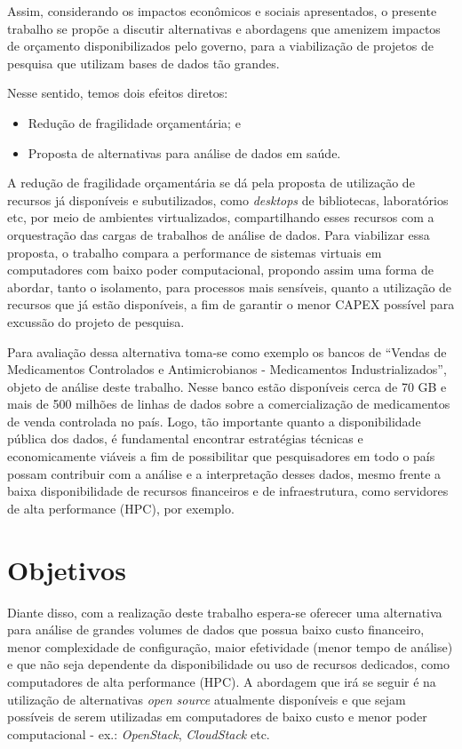 Assim, considerando os impactos econômicos e sociais apresentados, o presente trabalho se propõe a discutir alternativas e abordagens que amenizem impactos de orçamento disponibilizados pelo governo, para a viabilização de projetos de pesquisa que utilizam bases de dados tão grandes.

Nesse sentido, temos dois efeitos diretos:

\begin{itemize}
    \item Redução de fragilidade orçamentária; e
    \item Proposta de alternativas para análise de dados em saúde.
\end{itemize}

A redução de fragilidade orçamentária se dá pela proposta de utilização de recursos já disponíveis e subutilizados, como \emph{desktops} de bibliotecas, laboratórios etc, por meio de ambientes virtualizados, compartilhando esses recursos com a orquestração das cargas de trabalhos de análise de dados. Para viabilizar essa proposta, o trabalho compara a performance de sistemas virtuais em computadores com baixo poder computacional, propondo assim uma forma de abordar, tanto o isolamento, para processos mais sensíveis, quanto a utilização de recursos que já estão disponíveis, a fim de garantir o menor CAPEX possível para excussão do projeto de pesquisa. 

Para avaliação dessa alternativa toma-se como exemplo os bancos de “Vendas de Medicamentos Controlados e Antimicrobianos - Medicamentos Industrializados”, objeto de análise deste trabalho. Nesse banco estão disponíveis cerca de 70 GB e mais de 500 milhões de linhas de dados sobre a comercialização de medicamentos de venda controlada no país. Logo, tão importante quanto a disponibilidade pública dos dados, é fundamental encontrar estratégias técnicas e economicamente viáveis a fim de possibilitar que pesquisadores em todo o país possam contribuir com a análise e a interpretação desses dados, mesmo frente a baixa disponibilidade de recursos financeiros e de infraestrutura, como servidores de alta performance (HPC), por exemplo.

\section{Objetivos}
\label{sec:objetivos}
Diante disso, com a realização deste trabalho espera-se oferecer uma alternativa para análise de grandes volumes de dados que possua baixo custo financeiro, menor complexidade de configuração, maior efetividade (menor tempo de análise) e que não seja dependente da disponibilidade ou uso de recursos dedicados, como computadores de alta performance (HPC). A abordagem que irá se seguir é na utilização de alternativas \emph{open source} atualmente disponíveis e que sejam possíveis de serem utilizadas em computadores de baixo custo e menor poder computacional - ex.: \emph{OpenStack}, \emph{CloudStack} etc.

